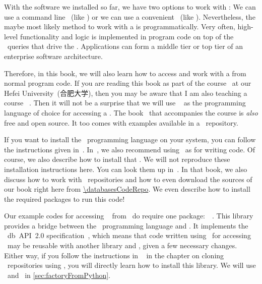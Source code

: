 %
\label{sec:pythonEtAl}%
%
With the software we installed so far, we have two options to work with :
We can use a command line ~(like \psql) or we can use a convenient ~(like \libreofficeBase).
Nevertheless, the maybe most likely method to work with a  is programmatically.
Very often, high-level functionality and logic is implemented in program code on top of the \sql\ queries that drive the .
Applications can form a middle tier or top tier of an enterprise software architecture.

Therefore, in this book, we will also learn how to access and work with a  from normal program code.
If you are reading this book as part of the  course~\cite{databases} at our Hefei University~(合肥大学), then you may be aware that I am also teaching a course ~\cite{programmingWithPython}.
Then it will not be a surprise that we will use \python~\cite{H2023ABGTP3P,LH2015DSAAWP,programmingWithPython} as the programming language of choice for accessing a .
The book~\cite{programmingWithPython} that accompanies the  course is \emph{also} free and open source.
It too comes with examples available in a \github\ repository.

If you want to install the \python\ programming language on your system, you can follow the instructions given in~\cite{programmingWithPython}.
In~\cite{programmingWithPython}, we also recommend using \pycharm\ as  for writing code.
Of course, we also describe how to install that .
We will not reproduce these installation instructions here.
You can look them up in~\cite{programmingWithPython}.
In that book, we also discuss how to work with \git\ repositories and how to even download the sources of our book right here from \url{\databasesCodeRepo}.
We even describe how to install the required packages to run this code!%
%
\begin{sloppypar}%
Our example codes for accessing \postgresql\  from \python\ do require one package:~\psycopg~\cite{VDGE2010P}.
This library provides a bridge between the \python\ programming language and \postgresql.
It implements the \python~\acrshort{db}~\acrshort{API}~2.0 specification~\cite{PEP249}, which means that code written using \psycopg\ for accessing \postgresql\ may be reusable with another library and , given a few necessary changes.
Either way, if you follow the instructions in ~\cite{programmingWithPython} in the chapter on cloning \git~repositories using \pycharm, you will directly learn how to install this library.
We will use \python\ and \psycopg\ in \cref{sec:factoryFromPython}.%
\end{sloppypar}%
%
%
%
\endhsection%
